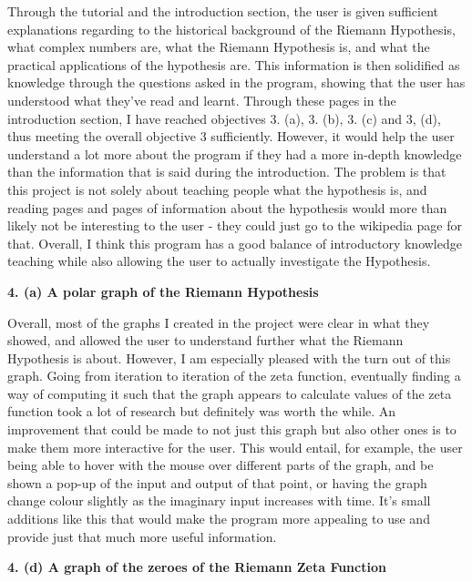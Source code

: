 \documentclass[12pt]{article}
\begin{document}
Through the tutorial and the introduction section, the user is given sufficient explanations regarding to the historical background of the Riemann Hypothesis, what complex numbers are, what the Riemann Hypothesis is, and what the practical applications of the hypothesis are. This information is then solidified as knowledge through the questions asked in the program, showing that the user has understood what they've read and learnt. Through these pages in the introduction section, I have reached objectives 3. (a), 3. (b), 3. (c) and 3, (d), thus meeting the overall objective 3 sufficiently. However, it would help the user understand a lot more about the program if they had a more in-depth knowledge than the information that is said during the introduction. The problem is that this project is not solely about teaching people what the hypothesis is, and reading pages and pages of information about the hypothesis would more than likely not be interesting to the user - they could just go to the wikipedia page for that. Overall, I think this program has a good balance of introductory knowledge teaching while also allowing the user to actually investigate the Hypothesis.


\textbf{4. (a) A polar graph of the Riemann Hypothesis}

Overall, most of the graphs I created in the project were clear in what they showed, and allowed the user to understand further what the Riemann Hypothesis is about. However, I am especially pleased with the turn out of this graph. Going from iteration to iteration of the zeta function, eventually finding a way of computing it such that the graph appears to calculate values of the zeta function took a lot of research but definitely was worth the while. An improvement that could be made to not just this graph but also other ones is to make them more interactive for the user. This would entail, for example, the user being able to hover with the mouse over different parts of the graph, and be shown a pop-up of the input and output of that point, or having the graph change colour slightly as the imaginary input increases with time. It's small additions like this that would make the program more appealing to use and provide just that much more useful information.

\textbf{4. (d) A graph of the zeroes of the Riemann Zeta Function}
\end{document}
